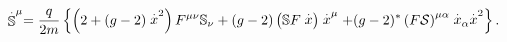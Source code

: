 \begin{equation}
\stackrel{.}{\Bbb{S}}^{\mu }=\frac{q}{2m}\left\{ \left( 2+(g-2)\stackrel{.}{x%
}^{2}\right) F^{\mu \nu }\Bbb{S}_{\nu }+(g-2)\left( \Bbb{S}F\stackrel{.}{x}%
\right) \stackrel{.}{x}^{\mu }+(g-2)^{*}\left( F\mathcal{S}\right) ^{\mu
\alpha }\stackrel{.}{x}_{\alpha }\stackrel{.}{x}^{2}\right\}.
\end{equation}

